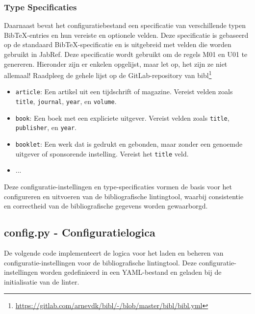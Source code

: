 \subsubsection{Type Specificaties}

Daarnaast bevat het configuratiebestand een specificatie van verschillende typen BibTeX-entries en hun vereiste en optionele velden. Deze specificatie is gebaseerd op de standaard BibTeX-specificatie en is uitgebreid met velden die worden gebruikt in JabRef. Deze specificatie wordt gebruikt om de regels M01 en U01 te genereren.
Hieronder zijn er enkelen opgelijst, maar let op, het zijn ze niet allemaal! Raadpleeg de gehele lijst op de GitLab-repository van bibl\footnote{\url{https://gitlab.com/arnevdk/bibl/-/blob/master/bibl/bibl.yml}}
\begin{itemize}
    \item \texttt{article}: Een artikel uit een tijdschrift of magazine. Vereist velden zoals \texttt{title}, \texttt{journal}, \texttt{year}, en \texttt{volume}.
    \item \texttt{book}: Een boek met een expliciete uitgever. Vereist velden zoals \texttt{title}, \texttt{publisher}, en \texttt{year}.
    \item \texttt{booklet}: Een werk dat is gedrukt en gebonden, maar zonder een genoemde uitgever of sponsorende instelling. Vereist het \texttt{title} veld.
    \item ...
\end{itemize}

Deze configuratie-instellingen en type-specificaties vormen de basis voor het configureren en uitvoeren van de bibliografische lintingtool, waarbij consistentie en correctheid van de bibliografische gegevens worden gewaarborgd.

\subsection{config.py - Configuratielogica}

De volgende code implementeert de logica voor het laden en beheren van configuratie-instellingen voor de bibliografische lintingtool. Deze configuratie-instellingen worden gedefinieerd in een YAML-bestand en geladen bij de initialisatie van de linter.

